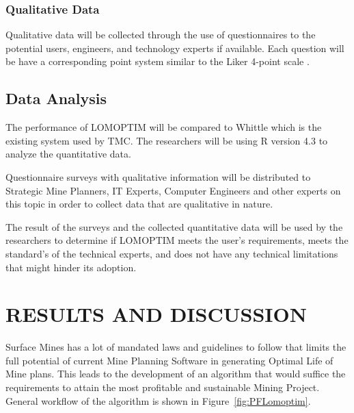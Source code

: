 \documentclass[12pt]{report}
\begin{document}
\subsection{Qualitative Data}

Qualitative data will be collected through the use of questionnaires to the potential users, engineers, and technology experts if available.
Each question will be have a corresponding point system similar to the Liker 4-point scale \cite{Likert}.

\section{Data Analysis}

The performance of LOMOPTIM will be compared to Whittle which is the existing system used by TMC.
The researchers will be using R version 4.3 \cite{R} to analyze the quantitative data.

Questionnaire surveys with qualitative information will be distributed to Strategic Mine Planners, IT Experts, Computer Engineers and other experts on this topic in order to collect data that are qualitative in nature.

The result of the surveys and the collected quantitative data will be used by the researchers to determine if LOMOPTIM meets the user's requirements, meets the standard's of the technical experts, and does not have any technical limitations that might hinder its adoption.

\chapter{RESULTS AND DISCUSSION}

Surface Mines has a lot of mandated laws and guidelines to follow that limits the full potential of current Mine Planning Software in generating Optimal Life of Mine plans.
This leads to the development of an algorithm that would suffice the requirements to attain the most profitable and sustainable Mining Project. 
General workflow of the algorithm is shown in Figure~\ref{fig:PFLomoptim}.
\end{document}
